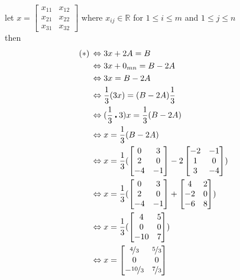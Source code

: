 \documentclass{jhwhw}
\theoremstyle{definition}
\theoremstyle{remark}
\theoremstyle{example}
\begin{document}
let \(x=\begin{bmatrix} x_{11} & x_{12} \\ x_{21} & x_{22} \\ x_{31} & x_{32} \end{bmatrix}\) where \(x_{ij} \in \mathbb{R}\) for \(1 \leq i \leq m\) and \(1 \leq j \leq n\)\\
then \begin{align*} 
(\ast) \, &\Leftrightarrow 3x + 2A = B\\
& \Leftrightarrow 3x + 0_{mn} = B - 2A\\
& \Leftrightarrow 3x = B - 2A\\
& \Leftrightarrow \frac{1}{3}(3x) = (B-2A)\frac{1}{3}\\
& \Leftrightarrow (\frac{1}{3} \centerdot 3)x = \frac{1}{3}(B-2A)\\
& \Leftrightarrow x = \frac{1}{3}(B - 2A) \\
& \Leftrightarrow x = \frac{1}{3}(\begin{bmatrix} 0 & 3 \\ 2 & 0 \\ -4 & -1\end{bmatrix} - 2 \begin{bmatrix} -2 & -1 \\ 1 & 0 \\ 3 & -4 \end{bmatrix})\\
& \Leftrightarrow x = \frac{1}{3}(\begin{bmatrix} 0 & 3 \\ 2 & 0 \\ -4 & -1\end{bmatrix} + \begin{bmatrix} 4 & 2 \\ -2 & 0 \\ -6 & 8 \end{bmatrix})\\
& \Leftrightarrow x = \frac{1}{3}(\begin{bmatrix} 4 & 5 \\ 0 & 0 \\ -10 & 7\end{bmatrix})\\
& \Leftrightarrow x = \begin{bmatrix} \nicefrac{4}{3} & \nicefrac{5}{3} \\ 0 & 0 \\ -\nicefrac{10}{3} & \nicefrac{7}{3} \end{bmatrix}
\end{align*}
\\ \\
\end{document}
